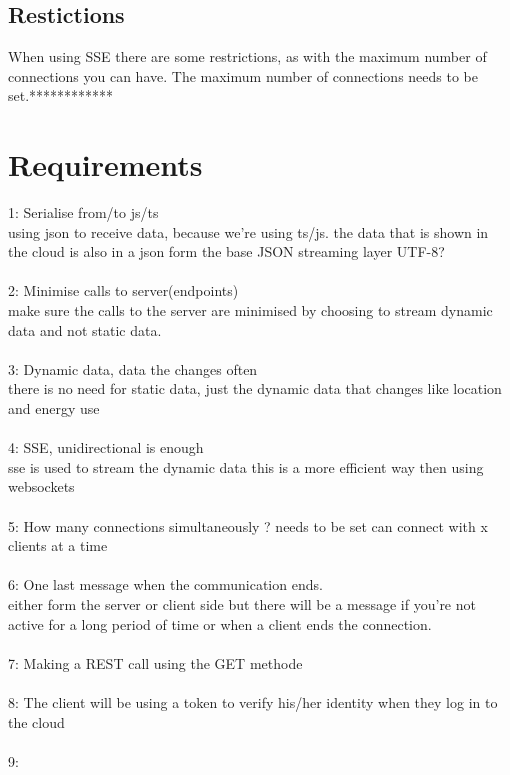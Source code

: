 \documentclass{article}
\begin{document}
\subsection{Restictions}\label{restrictions}
When using SSE there are some restrictions, as with the maximum number of connections you can have. The maximum number of connections needs to be set.************
\section{Requirements}\label{sec:requirements}
1: Serialise from/to js/ts\\
using json to receive data, because we're using ts/js.
the data that is shown in the cloud is also in a json form 
the base JSON streaming layer 
UTF-8?\\
\\
2: Minimise calls to server(endpoints)\\
make sure the calls to the server are minimised by choosing to stream dynamic data and not static data.\\
\\
3: Dynamic data, data the changes often\\
there is no need for static data, just the dynamic data that changes like location and energy use \\
\\
4: SSE, unidirectional is enough\\
sse is used to stream the dynamic data this is a more efficient way then using websockets\\
\\
5: How many connections simultaneously ? needs to be set
can connect with x clients at a time\\
\\
6: One last message when the communication ends. \\
either form the server or client side but there will be a message if you're not active for a long period of time or when a client ends the connection. \\
\\
7: Making a REST call using the GET methode\\
\\
8: The client will be using a token to verify his/her identity when they log in to the cloud\\
\\
9: 
\cleardoublepage
\end{document}
